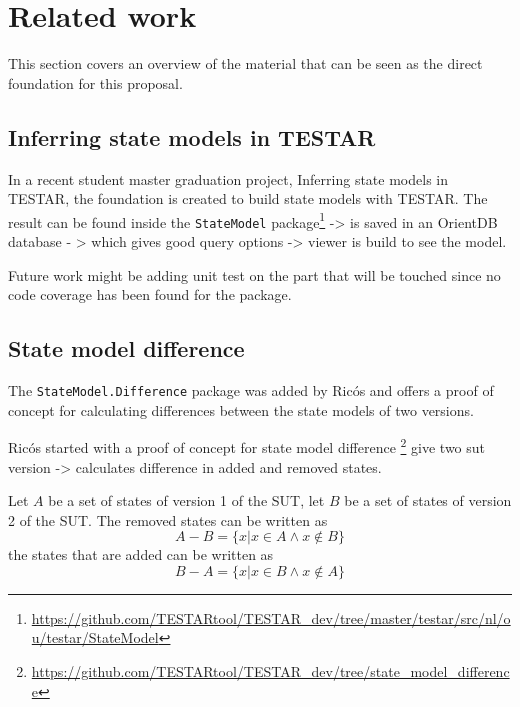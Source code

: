 \section{Related work} \label{releatedWork}
    
    This section covers an overview of the material that can be seen as the direct foundation for this proposal.
    
    \subsection{Inferring state models in TESTAR}
    
        In a recent student master graduation project, Inferring state models in TESTAR, \cite{thesisMulders}  the foundation is created to build state models with TESTAR. The result can be found inside the \verb|StateModel| package\footnote{\url{https://github.com/TESTARtool/TESTAR_dev/tree/master/testar/src/nl/ou/testar/StateModel}}
        -> is saved in an OrientDB database - > which gives good query options -> viewer is build to see the model. 
        
        Future work might be adding unit test on the part that will be touched since no code coverage has been found for the package.

        
        
        


    \subsection{State model difference}
        The \verb|StateModel.Difference| package was added by Ricós\cite{stateDiff} and offers a proof of concept for calculating differences between the state models of two versions. 
        
        Ricós started with a proof of concept for state model difference \footnote{\url{https://github.com/TESTARtool/TESTAR_dev/tree/state_model_difference}}
        give two sut version -> calculates difference in added and removed states.
        
        Let $A$ be a set of states of version 1 of the SUT, let $B$ be a set of states of version 2 of the SUT. The removed states can be written as
        \[A-B = \lbrace x | x \in A \wedge x \notin B \rbrace\]
        the states that are added can be written as
        \[B-A = \lbrace x | x \in B \wedge x \notin A \rbrace\]
        

